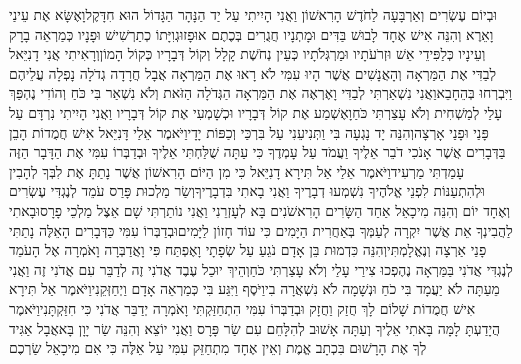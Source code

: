 \documentclass[../main/main.tex]{subfiles}
\begin{document}
\begin{multicols*}{\ncols}
וּבְיוֹם עֶשְׂרִים וְאַרְבָּעָה לַחֹדֶשׁ הָרִאשׁוֹן וַאֲנִי הָיִיתִי עַל יַד הַנָּהָר הַגָּדוֹל הוּא חִדָּקֶל\PreVerseSpace{}וָאֶשָּׂא אֶת עֵינַי וָאֵרֶא וְהִנֵּה אִישׁ אֶחָד לָבוּשׁ בַּדִּים וּמָתְנָיו חֲגֻרִים בְּכֶתֶם אוּפָז\PreVerseSpace{}וּגְוִיָּתוֹ כְתַרְשִׁישׁ וּפָנָיו כְּמַרְאֵה בָרָק וְעֵינָיו כְּלַפִּידֵי אֵשׁ וּזְרֹעֹתָיו וּמַרְגְּלֹתָיו כְּעֵין נְחֹשֶׁת קָלָל וְקוֹל דְּבָרָיו כְּקוֹל הָמוֹן\PreVerseSpace{}וְרָאִיתִי אֲנִי דָנִיֵּאל לְבַדִּי אֶת הַמַּרְאָה וְהָאֲנָשִׁים אֲשֶׁר הָיוּ עִמִּי לֹא רָאוּ אֶת הַמַּרְאָה אֲבָל חֲרָדָה גְדֹלָה נָפְלָה עֲלֵיהֶם וַיִּבְרְחוּ בְּהֵחָבֵא\PreVerseSpace{}וַאֲנִי נִשְׁאַרְתִּי לְבַדִּי וָאֶרְאֶה אֶת הַמַּרְאָה הַגְּדֹלָה הַזֹּאת וְלֹא נִשְׁאַר בִּי כֹּחַ וְהוֹדִי נֶהְפַּךְ עָלַי לְמַשְׁחִית וְלֹא עָצַרְתִּי כֹּחַ\PreVerseSpace{}וָאֶשְׁמַע אֶת קוֹל דְּבָרָיו וּכְשָׁמְעִי אֶת קוֹל דְּבָרָיו וַאֲנִי הָיִיתִי נִרְדָּם עַל פָּנַי וּפָנַי אָרְצָה\PreVerseSpace{}וְהִנֵּה יָד נָגְעָה בִּי וַתְּנִיעֵנִי עַל בִּרְכַּי וְכַפּוֹת יָדָי\PreVerseSpace{}וַיֹּאמֶר אֵלַי דָּנִיֵּאל אִישׁ חֲמֻדוֹת הָבֵן בַּדְּבָרִים אֲשֶׁר אָנֹכִי דֹבֵר אֵלֶיךָ וַעֲמֹד עַל עָמְדֶךָ כִּי עַתָּה שֻׁלַּחְתִּי אֵלֶיךָ וּבְדַבְּרוֹ עִמִּי אֶת הַדָּבָר הַזֶּה עָמַדְתִּי מַרְעִיד\PreVerseSpace{}וַיֹּאמֶר אֵלַי אַל תִּירָא דָנִיֵּאל כִּי מִן הַיּוֹם הָרִאשׁוֹן אֲשֶׁר נָתַתָּ אֶת לִבְּךָ לְהָבִין וּלְהִתְעַנּוֹת לִפְנֵי אֱלֹהֶיךָ נִשְׁמְעוּ דְבָרֶיךָ וַאֲנִי בָאתִי בִּדְבָרֶיךָ\PreVerseSpace{}וְשַׂר מַלְכוּת פָּרַס עֹמֵד לְנֶגְדִּי עֶשְׂרִים וְאֶחָד יוֹם וְהִנֵּה מִיכָאֵל אַחַד הַשָּׂרִים הָרִאשֹׁנִים בָּא לְעָזְרֵנִי וַאֲנִי נוֹתַרְתִּי שָׁם אֵצֶל מַלְכֵי פָרָס\PreVerseSpace{}וּבָאתִי לַהֲבִינְךָ אֵת אֲשֶׁר יִקְרָה לְעַמְּךָ בְּאַחֲרִית הַיָּמִים כִּי עוֹד חָזוֹן לַיָּמִים\PreVerseSpace{}וּבְדַבְּרוֹ עִמִּי כַּדְּבָרִים הָאֵלֶּה נָתַתִּי פָנַי אַרְצָה וְנֶאֱלָמְתִּי\PreVerseSpace{}וְהִנֵּה כִּדְמוּת בֵּן\SubEnd{} אָדָם נֹגֵעַ עַל שְׂפָתָי וָאֶפְתַּח פִּי וָאֲדַבְּרָה וָאֹמְרָה אֶל הָעֹמֵד לְנֶגְדִּי אֲדֹנִי בַּמַּרְאָה נֶהֶפְכוּ צִירַי עָלַי וְלֹא עָצַרְתִּי כֹּחַ\PreVerseSpace{}וְהֵיךְ יוּכַל עֶבֶד אֲדֹנִי זֶה לְדַבֵּר עִם אֲדֹנִי זֶה וַאֲנִי מֵעַתָּה לֹא יַעֲמָד בִּי כֹחַ וּנְשָׁמָה לֹא נִשְׁאֲרָה בִי\PreVerseSpace{}וַיֹּסֶף וַיִּגַּע בִּי כְּמַרְאֵה אָדָם וַיְחַזְּקֵנִי\PreVerseSpace{}וַיֹּאמֶר אַל תִּירָא אִישׁ חֲמֻדוֹת שָׁלוֹם לָךְ חֲזַק וַחֲזָק וּבְדַבְּרוֹ עִמִּי הִתְחַזַּקְתִּי וָאֹמְרָה יְדַבֵּר אֲדֹנִי כִּי חִזַּקְתָּנִי\PreVerseSpace{}וַיֹּאמֶר הֲיָדַעְתָּ לָמָּה בָּאתִי אֵלֶיךָ וְעַתָּה אָשׁוּב לְהִלָּחֵם עִם שַׂר פָּרָס וַאֲנִי יוֹצֵא וְהִנֵּה שַׂר יָוָן בָּא\PreVerseSpace{}אֲבָל אַגִּיד לְךָ אֶת הָרָשׁוּם בִּכְתָב אֱמֶת וְאֵין אֶחָד מִתְחַזֵּק עִמִּי עַל אֵלֶּה כִּי אִם מִיכָאֵל שַׂרְכֶם\OpenSection{}\par

\end{multicols*}
\end{document}
